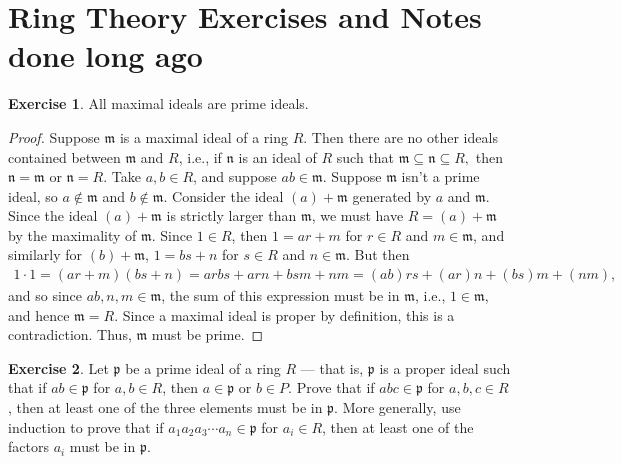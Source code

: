 \documentclass[9pt,reqno]{amsart}
\theoremstyle{definition}
\newtheorem{exercise}{Exercise}[section]
\newcommand{\idealp}{\mathfrak{p}}
\begin{document}
\section{Ring Theory Exercises and Notes done long ago } 
\begin{exercise} All maximal ideals are prime ideals.
\begin{proof} Suppose $\mathfrak{m}$ is a maximal ideal of a ring $R$. Then there are no other ideals contained between $\mathfrak{m}$ and $R$, i.e., if $\mathfrak{n}$ is an ideal of $R$ such that $ \mathfrak{m} \subseteq \mathfrak{n} \subseteq R,$ then $\mathfrak{n} = \mathfrak{m}$ or $\mathfrak{n} = R$. Take $a, b \in R$, and suppose $ab \in \mathfrak{m}$. Suppose $\mathfrak{m}$ isn't a prime ideal, so $a \notin \mathfrak{m}$ and $b \notin \mathfrak{m}$. Consider the ideal $(a) + \mathfrak{m}$ generated by $a$ and $\mathfrak{m}$. Since the ideal $(a) + \mathfrak{m}$ is strictly larger than $\mathfrak{m}$, we must have $R = (a) + \mathfrak{m}$ by the maximality of $\mathfrak{m}$. Since $1 \in R$, then $1 = ar + m$ for $r \in R$ and $m \in \mathfrak{m}$, and similarly for $(b) + \mathfrak{m}$, $1= bs + n$ for $s \in R$ and $n \in \mathfrak{m}$. But then 
\begin{align*}
1 \cdot 1 = (ar+m)(bs+n) = arbs +arn + bsm+nm = (ab)rs+(ar)n + (bs)m + (nm),
\end{align*}
and so since $ab, n, m \in \mathfrak{m}$, the sum of this expression must be in $\mathfrak{m}$, i.e., $1 \in \mathfrak{m}$, and hence $\mathfrak{m} = R$. Since a maximal ideal is proper by definition, this is a contradiction. Thus, $\mathfrak{m}$ must be prime. 
\end{proof}	
\end{exercise}
\begin{exercise} \textup{Let $\idealp$ be a prime ideal of a ring $R$ — that is, $\idealp$ is a proper ideal such that if $ab \in \idealp$ for $a, b \in R$, then $a \in \idealp$ or $b \in P$. Prove that if $abc \in \idealp$ for $a, b, c \in R$, then at least one of the three elements must be in $\idealp$. More generally, use induction to prove that if $a_1 a_2 a_3 \cdots a_n \in \idealp$ for $a_i \in R$, then at least one of the factors $a_i$ must be in $\idealp$.}
\end{exercise} 
\end{document}
